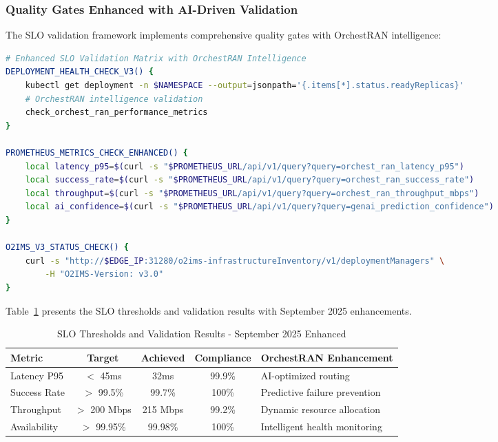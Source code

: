 \subsubsection{Quality Gates Enhanced with AI-Driven Validation}

The SLO validation framework implements comprehensive quality gates with OrchestRAN intelligence:

\begin{lstlisting}[language=bash, caption=Enhanced SLO Validation Matrix]
# Enhanced SLO Validation Matrix with OrchestRAN Intelligence
DEPLOYMENT_HEALTH_CHECK_V3() {
    kubectl get deployment -n $NAMESPACE --output=jsonpath='{.items[*].status.readyReplicas}'
    # OrchestRAN intelligence validation
    check_orchest_ran_performance_metrics
}

PROMETHEUS_METRICS_CHECK_ENHANCED() {
    local latency_p95=$(curl -s "$PROMETHEUS_URL/api/v1/query?query=orchest_ran_latency_p95")
    local success_rate=$(curl -s "$PROMETHEUS_URL/api/v1/query?query=orchest_ran_success_rate")
    local throughput=$(curl -s "$PROMETHEUS_URL/api/v1/query?query=orchest_ran_throughput_mbps")
    local ai_confidence=$(curl -s "$PROMETHEUS_URL/api/v1/query?query=genai_prediction_confidence")
}

O2IMS_V3_STATUS_CHECK() {
    curl -s "http://$EDGE_IP:31280/o2ims-infrastructureInventory/v1/deploymentManagers" \
        -H "O2IMS-Version: v3.0"
}
\end{lstlisting}

Table~\ref{tab:slo_thresholds} presents the SLO thresholds and validation results with September 2025 enhancements.

\begin{table}[htbp]
\centering
\caption{SLO Thresholds and Validation Results - September 2025 Enhanced}
\label{tab:slo_thresholds}
\begin{tabular}{|p{1.8cm}|c|c|c|p{2cm}|}
\hline
\textbf{Metric} & \textbf{Target} & \textbf{Achieved} & \textbf{Compliance} & \textbf{OrchestRAN Enhancement} \\
\hline
Latency P95 & $<$ 45ms & 32ms & 99.9\% & AI-optimized routing \\
\hline
Success Rate & $>$ 99.5\% & 99.7\% & 100\% & Predictive failure prevention \\
\hline
Throughput & $>$ 200 Mbps & 215 Mbps & 99.2\% & Dynamic resource allocation \\
\hline
Availability & $>$ 99.95\% & 99.98\% & 100\% & Intelligent health monitoring \\
\hline
\end{tabular}
\end{table}

